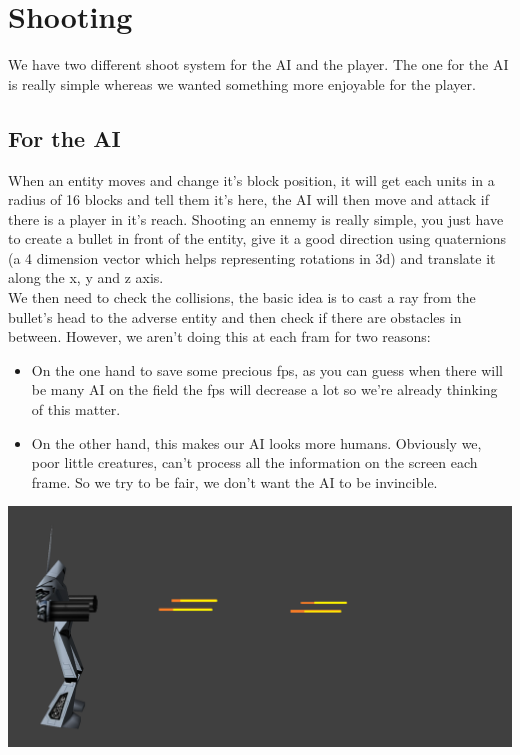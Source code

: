 \documentclass[article]{report}             %
\begin{document}
			
			\section{Shooting}
				We have two different shoot system for the AI and the player. The one for the AI is really simple whereas we wanted something more enjoyable for the player.


				\subsection{For the AI}
					When an entity moves and change it's block position, it will get each units in a radius of 16 blocks and tell them it's here, the AI will then move and attack if there is a player in it's reach. Shooting an ennemy is really simple, you just have to create a bullet in front of the entity, give it a good direction using quaternions (a 4 dimension vector which helps representing rotations in 3d) and translate it along the x, y and z axis.\\

					We then need to check the collisions, the basic idea is to cast a ray from the bullet's head to the adverse entity and then check if there are obstacles in between. However, we aren't doing this at each fram for two reasons:\\
					\begin{itemize}
						\item On the one hand to save some precious fps, as you can guess when there will be many AI on the field the fps will decrease a lot so we're already thinking of this matter.
						\item On the other hand, this makes our AI looks more humans. Obviously we, poor little creatures, can't process all the information on the screen each frame. So we try to be fair, we don't want the AI to be invincible.
					\end{itemize}
				\begin{center}
					\includegraphics[width = 15cm]{images/robotShoot.png}
				\end{center}
				
\end{document}
